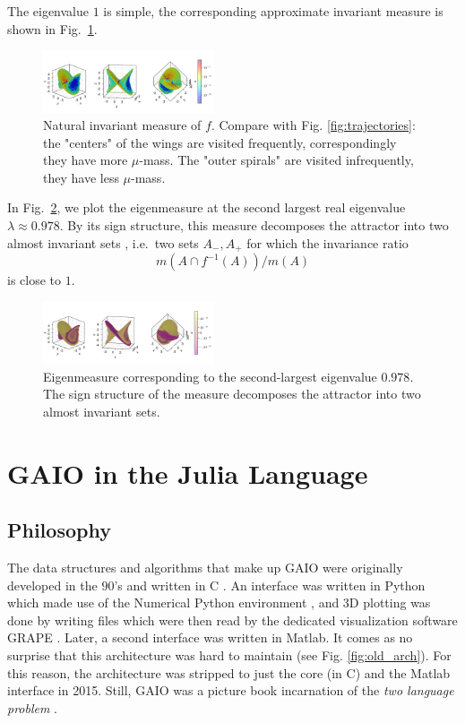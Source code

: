 \documentclass{juliacon}
\begin{document}
The eigenvalue $1$ is simple, the corresponding approximate invariant measure is shown in Fig.~\ref{fig:invariantmeasure}.  
\begin{figure}[h]
    \centering
    \includegraphics[width=0.45\textwidth]{inv_measure.png}
    \caption{Natural invariant measure of $f$. Compare with Fig. \ref{fig:trajectories}: the "centers" of the wings are visited frequently, correspondingly they have more $\mu$-mass. The "outer spirals" are visited infrequently, they have less $\mu$-mass.}
    \label{fig:invariantmeasure}
\end{figure}

In Fig.~\ref{fig:almostinvariant}, we plot the eigenmeasure at the second largest real eigenvalue $\lambda\approx 0.978$. By its sign structure, this measure decomposes the attractor into two almost invariant sets \cite{DeJu:99}, i.e.\ two sets $A_-,A_+$ for which the invariance ratio $$m(A\cap f^{-1} (A))/m(A)$$ is close to $1$.
\begin{figure}[h]
    \centering
    \includegraphics[width=0.45\textwidth]{almost_inv.png}
    \caption{Eigenmeasure corresponding to the second-largest eigenvalue $0.978$. The sign structure of the measure decomposes the attractor into two almost invariant sets.}
    \label{fig:almostinvariant}
\end{figure}

\section{GAIO in the Julia Language}
\label{sec:architecture}

\subsection{Philosophy}

The data structures and algorithms that make up GAIO were originally developed in the $90$'s and written in C \cite{DeFrJu:01}. An interface was written in Python which made use of the Numerical Python environment \cite{harris2020array}, and 3D plotting was done by writing files which were then read by the dedicated visualization software GRAPE \cite{RuWi92a}.  Later, a second interface was written in Matlab.  It comes as no surprise that this architecture was hard to maintain (see Fig. \ref{fig:old_arch}). For this reason, the architecture was stripped to just the core (in C) and the Matlab interface in 2015. Still, GAIO was a picture book incarnation of the \emph{two language problem} \cite{BeEdKaSh:17}. 
\end{document}
